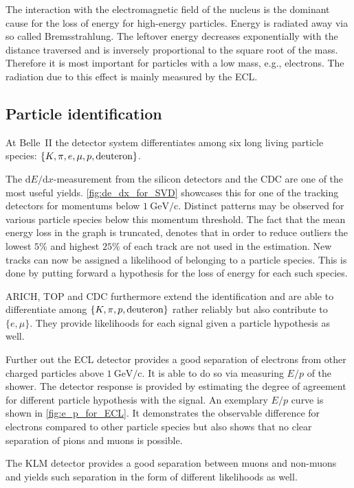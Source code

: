 The interaction with the electromagnetic field of the nucleus is the dominant cause for the loss of energy for high-energy particles. Energy is radiated away via so called Bremsstrahlung. The leftover energy decreases exponentially with the distance traversed and is inversely proportional to the square root of the mass. Therefore it is most important for particles with a low mass, e.g., electrons. The radiation due to this effect is mainly measured by the ECL.

\subsection{Particle identification}
\label{subsec:particle_identification}

At Belle~\RN{2} the detector system differentiates among six long living particle species: $\{K, \pi, e, \mu, p, \hbox{deuteron}\}$.

The $\mathrm{d}E/\mathrm{d}x$-measurement from the silicon detectors and the CDC are one of the most useful yields. \autoref{fig:de_dx_for_SVD} showcases this for one of the tracking detectors for momentums below $1 \mathrm{~GeV/c}$. Distinct patterns may be observed for various particle species below this momentum threshold. The fact that the mean energy loss in the graph is truncated, denotes that in order to reduce outliers the lowest $5\%$ and highest $25\%$ of each track are not used in the estimation.
New tracks can now be assigned a likelihood of belonging to a particle species. This is done by putting forward a hypothesis for the loss of energy for each such species.

ARICH, TOP and CDC furthermore extend the identification and are able to differentiate among $\{K, \pi, p, \hbox{deuteron}\}$ rather reliably but also contribute to $\{e, \mu\}$. They provide likelihoods for each signal given a particle hypothesis as well.

Further out the ECL detector provides a good separation of electrons from other charged particles above $1 \mathrm{~GeV/c}$. It is able to do so via measuring $E/p$ of the shower. The detector response is provided by estimating the degree of agreement for different particle hypothesis with the signal. An exemplary $E/p$ curve is shown in \autoref{fig:e_p_for_ECL}. It demonstrates the observable difference for electrons compared to other particle species but also shows that no clear separation of pions and muons is possible.

The KLM detector provides a good separation between muons and non-muons and yields such separation in the form of different likelihoods as well.

